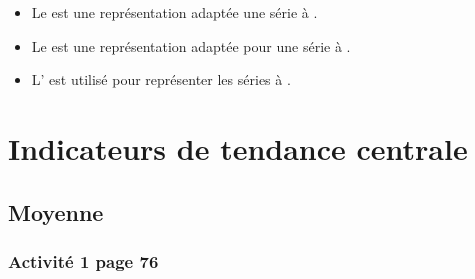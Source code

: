 \documentclass[12pt,a4paper]{article}
\begin{document}
\begin{mybilan}
	\begin{itemize}
		\item Le  est une représentation adaptée une série à .
		\item Le  est une représentation adaptée pour une série à .
		\item L' est utilisé pour représenter les séries à .
	\end{itemize}
\end{mybilan}

\section{Indicateurs de tendance centrale}

\subsection{Moyenne}

\subsubsection*{Activité 1 page 76}
\end{document}
